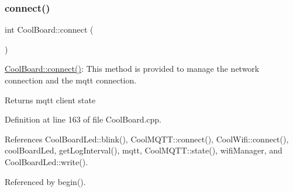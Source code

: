 \subsubsection{\texorpdfstring{connect()}{connect()}}
{\footnotesize\ttfamily int Cool\+Board\+::connect (\begin{DoxyParamCaption}{ }\end{DoxyParamCaption})}

\hyperlink{classCoolBoard_a519de78b807f8ec6463ff484eb925918}{Cool\+Board\+::connect()}\+: This method is provided to manage the network connection and the mqtt connection.

\begin{DoxyReturn}{Returns}
mqtt client state 
\end{DoxyReturn}


Definition at line 163 of file Cool\+Board.\+cpp.



References Cool\+Board\+Led\+::blink(), Cool\+M\+Q\+T\+T\+::connect(), Cool\+Wifi\+::connect(), cool\+Board\+Led, get\+Log\+Interval(), mqtt, Cool\+M\+Q\+T\+T\+::state(), wifi\+Manager, and Cool\+Board\+Led\+::write().



Referenced by begin().


